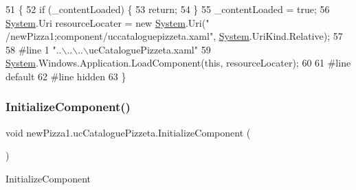 \begin{DoxyCode}
51                                           \{
52             \textcolor{keywordflow}{if} (\_contentLoaded) \{
53                 \textcolor{keywordflow}{return};
54             \}
55             \_contentLoaded = \textcolor{keyword}{true};
56             \hyperlink{namespaceSystem}{System}.Uri resourceLocater = \textcolor{keyword}{new} \hyperlink{namespaceSystem}{System}.Uri(\textcolor{stringliteral}{"
      /newPizza1;component/uccataloguepizzeta.xaml"}, \hyperlink{namespaceSystem}{System}.UriKind.Relative);
57             
58 \textcolor{preprocessor}{            #line 1 "..\(\backslash\)..\(\backslash\)..\(\backslash\)ucCataloguePizzeta.xaml"}
59             \hyperlink{namespaceSystem}{System}.Windows.Application.LoadComponent(\textcolor{keyword}{this}, resourceLocater);
60             
61 \textcolor{preprocessor}{            #line default}
62 \textcolor{preprocessor}{            #line hidden}
63         \}
\end{DoxyCode}
\mbox{\label{classnewPizza1_1_1ucCataloguePizzeta_afdbc12c0fdebf3e506da6fe56e30af7b}} 
\subsubsection{\texorpdfstring{Initialize\+Component()}{InitializeComponent()}\hspace{0.1cm}{\footnotesize\ttfamily [3/6]}}
{\footnotesize\ttfamily void new\+Pizza1.\+uc\+Catalogue\+Pizzeta.\+Initialize\+Component (\begin{DoxyParamCaption}{ }\end{DoxyParamCaption})\hspace{0.3cm}{\ttfamily [inline]}}



Initialize\+Component 


